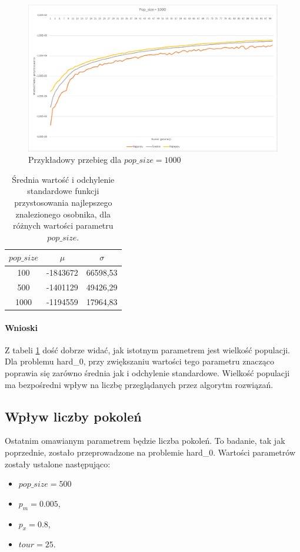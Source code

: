 \documentclass{article}
\begin{document}
	\begin{figure}[H]
		\centering
		\includegraphics[width=1\linewidth]{popsize1000.png}
		\caption{Przykładowy przebieg dla $pop\_size=1000$}
		\label{fig:pop1000}
	\end{figure}

	\begin{table}[H]
		\begin{center}
			\begin{tabular}{ |c|c|c| } 
				\hline
				$pop\_size$ & $\mu$ & $\sigma$ \\ 
				\hline
				100 & -1843672 & 66598,53 \\ 
				500 & -1401129 & 49426,29 \\ 
				1000 & -1194559 & 17964,83 \\ 
				\hline
			\end{tabular}
			\caption{Średnia wartość i odchylenie standardowe funkcji przystosowania najlepszego znalezionego osobnika, dla różnych wartości parametru $pop\_size$.}
			\label{tab:pop}
		\end{center}
	\end{table}
	
	\paragraph{Wnioski}
	Z tabeli \ref{tab:pop} dość dobrze widać, jak istotnym parametrem jest wielkość populacji. Dla problemu hard\_0, przy zwiększaniu wartości tego parametru znacząco poprawia się zarówno średnia jak i odchylenie standardowe. Wielkość populacji ma bezpośredni wpływ na liczbę przeglądanych przez algorytm rozwiązań.
	
	
	\newpage
	\subsection{Wpływ liczby pokoleń}
	Ostatnim omawianym parametrem będzie liczba pokoleń. To badanie, tak jak poprzednie, zostało przeprowadzone na problemie hard\_0. Wartości parametrów zostały ustalone następująco:
	\begin{itemize}
		\item $pop\_size = 500$
		\item $p_m = 0.005$,
		\item $p_x = 0.8$,
		\item $tour = 25$.
	\end{itemize}
	
\end{document}
